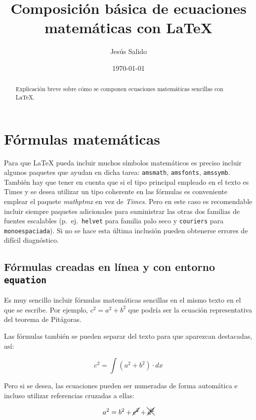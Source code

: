 \documentclass[11pt,a4paper]{article}
\author{Jesús Salido}
\title{Composición básica de ecuaciones matemáticas con \LaTeX{}}
\date{\today}
\begin{document}
\maketitle

\begin{abstract}
	Explicación breve sobre cómo se componen ecuaciones matemáticas sencillas con \LaTeX{}.
\end{abstract}


\tableofcontents


\section{Fórmulas matemáticas}
Para que \LaTeX{} pueda incluir muchos símbolos matemáticos es preciso incluir algunos paquetes que ayudan en dicha tarea: \texttt{amsmath}, \texttt{amsfonts}, \texttt{amssymb}. También hay que tener en cuenta que si el tipo principal empleado en el texto es Times y se desea utilizar un tipo coherente en las fórmulas es conveniente emplear el paquete \emph{mathptmx} en vez de \emph{Times}. Pero en este caso es recomendable incluir siempre paquetes adicionales para suministrar las otras dos familias de fuentes escalables (p.~ej.\ \texttt{helvet} para familia \textsf{palo seco} y \texttt{couriers} para \texttt{monoespaciada}). Si no se hace esta última inclusión pueden obtenerse errores de difícil diagnóstico.



\subsection{Fórmulas creadas en línea y con entorno \texttt{equation}}
Es muy sencillo incluir fórmulas matemáticas sencillas en el mismo texto en el que se escribe. Por ejemplo, $c^{2}=a^{2}+b^{2}$ que podría ser la ecuación representativa del teorema de Pitágoras.

Las fórmulas también se pueden separar del texto para que aparezcan destacadas, así:

\[
c^2  = \int {\left( {a^2  + b^2} \right)}  \cdot dx
\]


Pero si se desea, las ecuaciones pueden ser numeradas de forma automática e incluso utilizar referencias cruzadas a ellas:

\begin{equation} \label{eq:pitagoras}
	a^{2}=b^{2} + \cancel{c^{2}}+ \xcancel{d^{2}}
\end{equation}
\end{document}
